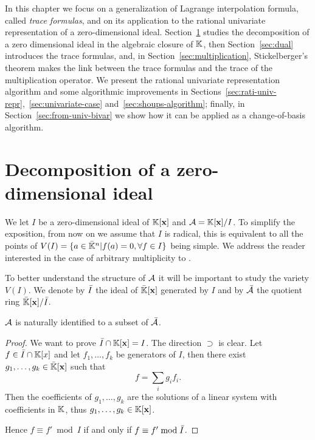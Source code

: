 In this chapter we focus on a generalization of Lagrange interpolation
formula, called \emph{trace formulas}, and on its application to the
rational univariate representation of a zero-dimensional
ideal. Section~\ref{sec:decomp-zero-dimens} studies the decomposition
of a zero dimensional ideal in the algebraic closure of $\mathbb{K}$, then
Section~\ref{sec:dual} introduces the trace formulas, and, in
Section~\ref{sec:multiplication}, Stickelberger's theorem makes the
link between the trace formulas and the trace of the multiplication
operator. We present the rational univariate representation algorithm
and some algorithmic improvements in
Sections~\ref{sec:rati-univ-repr},~\ref{sec:univariate-case}
and~\ref{sec:shoups-algorithm}; finally, in
Section~\ref{sec:from-univ-bivar} we show how it can be applied as a
change-of-basis algorithm.


\section{Decomposition of a zero-dimensional ideal}
\label{sec:decomp-zero-dimens}

We let $I$ be a zero-dimensional ideal of $\mathbb{K}[\mathbf{x}]$ and
$\mathcal{A}=\mathbb{K}[\mathbf{x}]/I$.  To simplify the exposition, from now on we
assume that $I$ is radical, this is equivalent to all the points of
$V(I)=\{a\in\bar{\mathbb{K}}^n|f(a)=0, \forall f\in I\}$ being simple. We
address the reader interested in the case of arbitrary multiplicity to
\cite{mourrain+elkadi}.

To better understand the structure of $\mathcal{A}$ it will be important
to study the variety $V(I)$. We denote by $\bar{I}$ the ideal of
$\bar{\mathbb{K}}[\mathbf{x}]$ generated by $I$ and by $\bar{\mathcal{A}}$ the
quotient ring $\bar{\mathbb{K}}[\mathbf{x}]/\bar{I}$.

\begin{lemma}
  $\mathcal{A}$ is naturally identified to a subset of $\bar{\mathcal{A}}$.
\end{lemma}
\begin{proof}
  We want to prove $\bar{I}\cap\mathbb{K}[\mathbf{x}]=I$. The direction
  $\supset$ is clear. Let $f\in\bar{I}\cap\mathbb{K}[x]$ and let
  $f_1,\ldots,f_k$ be generators of $I$, then there exist
  $g_1,\ldots,g_k\in\bar{\mathbb{K}}[\mathbf{x}]$ such that
  \begin{equation}
    \label{eq:114}
    f = \sum_i g_if_i
    \text{.}
  \end{equation}
  Then the coefficients of $g_1,\ldots,g_k$ are the solutions of a
  linear system with coefficients in $\mathbb{K}$, thus
  $g_1,\ldots,g_k\in\mathbb{K}[\mathbf{x}]$.

  Hence $f\equiv f'\bmod I$ if and only if $f\equiv f'\bmod\bar{I}$.
\end{proof}

